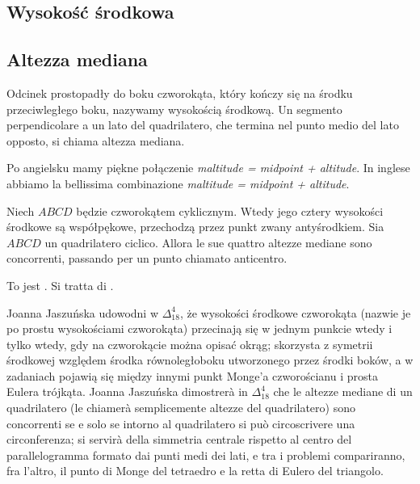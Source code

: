 
%

\subsection{Wysokość środkowa} %
\subsection{Altezza mediana} %

\begin{definition}
[wysokość środkowa] %
[altezza mediana] %
Odcinek prostopadły do boku czworokąta, który kończy się na środku przeciwległego boku, nazywamy wysokością środkową. %
Un segmento perpendicolare a un lato del quadrilatero, che termina nel punto medio del lato opposto, si chiama altezza mediana. %
\end{definition}

Po angielsku mamy piękne połączenie \emph{maltitude = midpoint + altitude}. %
In inglese abbiamo la bellissima combinazione \emph{maltitude = midpoint + altitude}. %

\begin{definition}
Niech $ABCD$ będzie czworokątem cyklicznym. %
Wtedy jego cztery wysokości środkowe są współpękowe, przechodzą przez punkt zwany antyśrodkiem. %
Sia $ABCD$ un quadrilatero ciclico. %
Allora le sue quattro altezze mediane sono concorrenti, passando per un punto chiamato anticentro. %
\end{definition}

To jest \cite[zadanie 4.30]{pompe_2022}. %
Si tratta di \cite[esercizio 4.30]{pompe_2022}. %

Joanna Jaszuńska udowodni w $\Delta_{18}^{4}$, że wysokości środkowe czworokąta (nazwie je po prostu wysokościami czworokąta) przecinają się w jednym punkcie wtedy i tylko wtedy, gdy na czworokącie można opisać okrąg; skorzysta z symetrii środkowej względem środka równoległoboku utworzonego przez środki boków, a w zadaniach pojawią się między innymi punkt Monge'a czworościanu i prosta Eulera trójkąta. %
Joanna Jaszuńska dimostrerà in $\Delta_{18}^{4}$ che le altezze mediane di un quadrilatero (le chiamerà semplicemente altezze del quadrilatero) sono concorrenti se e solo se intorno al quadrilatero si può circoscrivere una circonferenza; si servirà della simmetria centrale rispetto al centro del parallelogramma formato dai punti medi dei lati, e tra i problemi compariranno, fra l'altro, il punto di Monge del tetraedro e la retta di Eulero del triangolo. %

